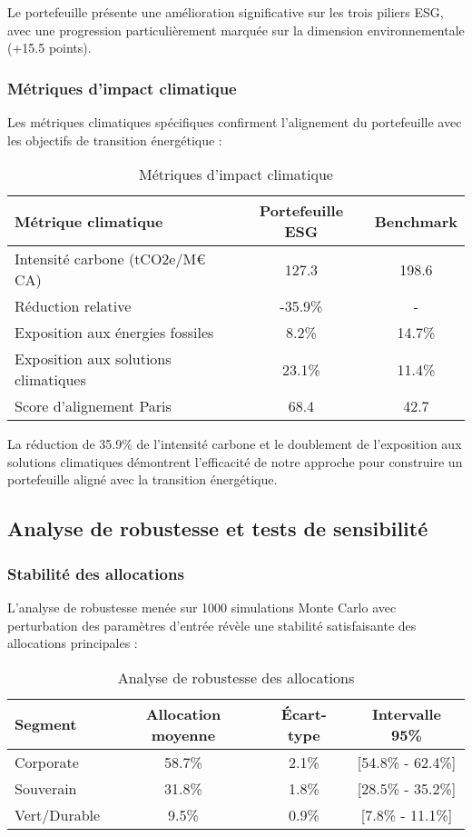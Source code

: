 Le portefeuille présente une amélioration significative sur les trois piliers ESG, avec une progression particulièrement marquée sur la dimension environnementale (+15.5 points).

\subsubsection{Métriques d'impact climatique}

Les métriques climatiques spécifiques confirment l'alignement du portefeuille avec les objectifs de transition énergétique :

\begin{table}[h!]
\centering

\begin{tabular}{lcc}
\hline
\textbf{Métrique climatique} & \textbf{Portefeuille ESG} & \textbf{Benchmark} \\
\hline
Intensité carbone (tCO2e/M€ CA) & 127.3 & 198.6 \\
Réduction relative & -35.9\% & - \\
Exposition aux énergies fossiles & 8.2\% & 14.7\% \\
Exposition aux solutions climatiques & 23.1\% & 11.4\% \\
Score d'alignement Paris & 68.4 & 42.7 \\
\hline
\end{tabular}
\caption{Métriques d'impact climatique}
\end{table}

La réduction de 35.9\% de l'intensité carbone et le doublement de l'exposition aux solutions climatiques démontrent l'efficacité de notre approche pour construire un portefeuille aligné avec la transition énergétique.

\subsection{Analyse de robustesse et tests de sensibilité}

\subsubsection{Stabilité des allocations}

L'analyse de robustesse menée sur 1000 simulations Monte Carlo avec perturbation des paramètres d'entrée révèle une stabilité satisfaisante des allocations principales :

\begin{table}[h!]
\centering
\begin{tabular}{lccc}
\hline
\textbf{Segment} & \textbf{Allocation moyenne} & \textbf{Écart-type} & \textbf{Intervalle 95\%} \\
\hline
Corporate & 58.7\% & 2.1\% & [54.8\% - 62.4\%] \\
Souverain & 31.8\% & 1.8\% & [28.5\% - 35.2\%] \\
Vert/Durable & 9.5\% & 0.9\% & [7.8\% - 11.1\%] \\
\hline
\end{tabular}
\caption{Analyse de robustesse des allocations}
\end{table}

